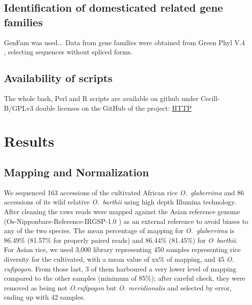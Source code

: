 \documentclass[10pt,letterpaper]{article}
\begin{document}
  \subsection*{Identification of domesticated related gene families}
  GenFam was used...
  Data from gene families were obtained from Green Phyl V.4  \cite{Conte2008b, Conte2008a, Rouard2011}, selecting sequences without spliced forms.
  
  \subsection*{Availability of scripts}
  The whole bash, Perl and R scripts are available on github under Cecill-B/GPLv3 double licenses on the GitHub of the project: \url{HTTP}

\section*{Results}
\subsection*{Mapping and Normalization}
We sequenced 163 accessions of the cultivated African rice \emph{O.~glaberrima} and 86 accessions of its wild relative \emph{O.~barthii} using high depth Illumina technology. After cleaning the raws reads were mapped against the Asian reference genome (Os-Nipponbare-Reference-IRGSP-1.0 \cite{Mcnally2009, Kawahara2013}) as an external reference to avoid biases to any of the two species. The mean percentage of mapping for \emph{O.~glaberrima} is 86.49\% (81.57\% for properly paired reads) and 86.44\% (81.45\%) for \emph{O~barthii}. For Asian rice, we used 3,000 library representing 450 samples representing rice diversity for the cultivated, with a mean value of xx\% of mapping, and 45 \textit{O. rufipogon}. From those last, 3 of them harboured a very lower level of mapping compared to the other samples (minimum of 85\%); after careful check, they were removed as being not \textit{O.rufipogon} but \textit{O. meridionalis} and selected by error, ending up with 42 samples. 
\end{document}
